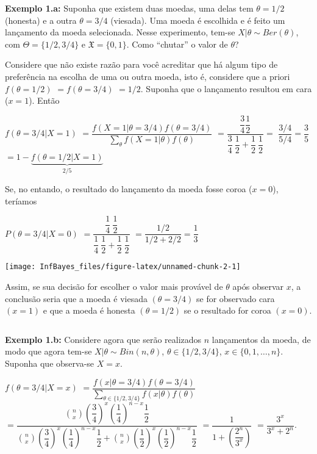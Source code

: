 \documentclass[
]{book}
\begin{document}
\(~\)

\textbf{Exemplo 1.a:} Suponha que existem duas moedas, uma delas tem \(\theta =1/2\) (honesta) e a outra \(\theta=3/4\) (viesada). Uma moeda é escolhida e é feito um lançamento da moeda selecionada. Nesse experimento, tem-se \(X|\theta \sim Ber(\theta)\), com \(\Theta=\{1/2,3/4\}\) e \(\mathfrak{X}=\{0,1\}\). Como ``chutar'' o valor de \(\theta\)?

Considere que não existe razão para você acreditar que há algum tipo de preferência na escolha de uma ou outra moeda, isto é, considere que a priori \(f(\theta=1/2)\) \(=f(\theta=3/4)\) \(=1/2\). Suponha que o lançamento resultou em cara (\(x=1\)). Então

\(f(\theta = 3/4|X=1)\) \(=\dfrac{f(X=1|\theta=3/4)f(\theta=3/4)}{\sum_\theta f(X=1|\theta)f(\theta)}\) \(=\dfrac{\dfrac{3}{4}\dfrac{1}{2}}{\dfrac{3}{4}~\dfrac{1}{2}+\dfrac{1}{2}~\dfrac{1}{2}}=\) \(\dfrac{3/4}{5/4}=\dfrac{3}{5}\) \(= 1-\underbrace{f(\theta=1/2|X=1)}_{2/5}\)

Se, no entando, o resultado do lançamento da moeda fosse coroa (\(x=0\)), teríamos

\(P(\theta=3/4|X=0)\) \(=\dfrac{\dfrac{1}{4}~\dfrac{1}{2}}{\dfrac{1}{4}~\dfrac{1}{2}+\dfrac{1}{2}~\dfrac{1}{2}}\) \(=\dfrac{1/2}{1/2+2/2}=\dfrac{1}{3}\)

\begin{center}\texttt{[image: InfBayes\_files/figure-latex/unnamed-chunk-2-1]} \end{center}

Assim, se sua decisão for escolher o valor mais provável de \(\theta\) após observar \(x\), a conclusão seria que a moeda é viesada \((\theta=3/4)\) se for observado cara \((x=1)\) e que a moeda é honesta \((\theta=1/2)\) se o resultado for coroa \((x=0)\).

\(~\)

\textbf{Exemplo 1.b:} Considere agora que serão realizados \(n\) lançamentos da moeda, de modo que agora tem-se \(X|\theta \sim Bin(n,\theta)\), \(\theta \in \{1/2,3/4\}\), \(x \in \{0,1,\ldots,n\}\). Suponha que observa-se \(X=x\).

\(f(\theta=3/4|X=x)\) \(=\dfrac{f(x|\theta=3/4)f(\theta=3/4)}{\displaystyle \sum_{\theta\in \{1/2,3/4\}}f(x|\theta)f(\theta)}\) \(=\dfrac{\displaystyle \binom{n}{x}\left(\dfrac{3}{4}\right)^x\left(\dfrac{1}{4}\right)^{n-x}\dfrac{1}{2}}{\displaystyle \binom{n}{x}\left(\dfrac{3}{4}\right)^x\left(\dfrac{1}{4}\right)^{n-x}\dfrac{1}{2}+\displaystyle\binom{n}{x}\left(\dfrac{1}{2}\right)^x\left(\dfrac{1}{2}\right)^{n-x}\dfrac{1}{2}}\) \(=\dfrac{1}{1+\left(\dfrac{2^n}{3^x}\right)}\) \(=\dfrac{3^x}{3^x + 2^n}\).
\end{document}
